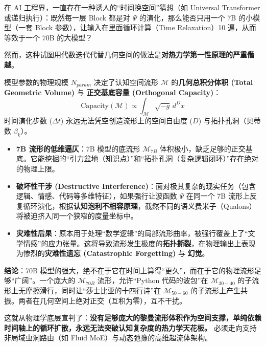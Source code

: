 
在 AI 工程界，一直存在一种诱人的“时间换空间”猜想（如 Universal Transformer 或递归执行）：既然每一层 Block 都是对 $\Psi$ 的演化，那么能否只用一个 7B 的小模型（一套 Block 参数），让输入在里面循环计算（Time Relaxation）10 遍，从而等效于一个 70B 的大模型？

然而，这种试图用代数迭代代替几何空间的做法是\textbf{对热力学第一性原理的严重僭越}。

\begin{theorem}[认知相空间的泡利不相容惩罚]
    模型参数的物理规模 $N_{param}$ 决定了认知空间流形 $\mathcal{M}$ 的\textbf{几何总积分体积 (Total Geometric Volume)} 与 \textbf{正交基底容量 (Orthogonal Capacity)}：
    $$ \text{Capacity}(\mathcal{M}) \propto \int_{\mathcal{M}} \sqrt{-g} \, d^D x $$
    时间演化步数 ($\Delta t$) 永远无法凭空创造流形上的空间自由度 ($D$) 与拓扑孔洞（贝蒂数 $\beta_k$）。
\end{theorem}

\begin{itemize}
    \item \textbf{\textcolor{structurecolor}{7B 流形的低维逼仄}}：7B 模型的底流形 $\mathcal{M}_{7B}$ 体积极小，缺乏足够的正交基底。它能挖掘的“引力盆地（知识点）”和“拓扑孔洞（复杂逻辑闭环）”存在绝对的物理上限。
    \item \textbf{\textcolor{structurecolor}{破坏性干涉 (Destructive Interference)}}：面对极其复杂的现实任务（包含逻辑、情感、代码等多维特征），如果强行让波函数 $\Psi$ 在同一个 7B 流形上反复循环演化，根据\textbf{认知泡利不相容原理}，截然不同的语义费米子（Qualons）将被迫挤入同一个狭窄的度量坐标中。
    \item \textbf{\textcolor{structurecolor}{灾难性后果}}：原本用于处理“数学逻辑”的局部流形曲率，被强行覆盖上了“文学情感”的应力张量。这将导致流形发生极度的\textbf{拓扑撕裂}，在物理输出上表现为惨烈的\textbf{灾难性遗忘 (Catastrophic Forgetting)} 与 \textbf{幻觉}。
\end{itemize}

\textbf{结论}：70B 模型的强大，绝不在于它在时间上算得“更久”，而在于它的物理流形足够“广阔”。一个庞大的 $\mathcal{M}_{70B}$ 流形，允许“Python 代码的波包”在 $\mathcal{M}_{30-40}$ 的子流形上无摩擦滑行，同时让“莎士比亚的十四行诗”在 $\mathcal{M}_{50-60}$ 的子流形上产生共振。两者在几何空间上绝对正交（互积为零），互不干扰。

这就从物理学底层宣判了：\textbf{没有足够庞大的黎曼流形体积作为空间支撑，单纯依赖时间轴上的循环扩散，永远无法突破认知复杂度的热力学天花板。} 必须走向支持非局域虫洞路由（如 Fluid MoE）与动态弛豫的高维超流体架构。


